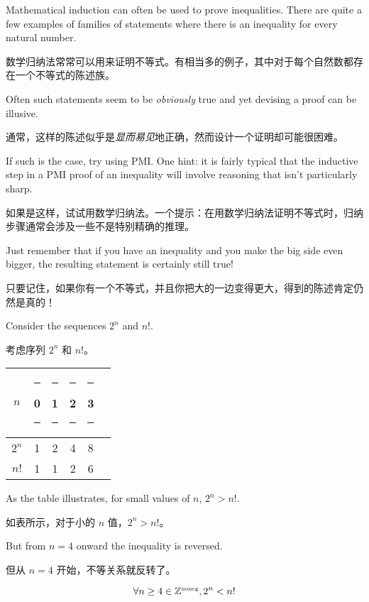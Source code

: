 Mathematical induction 
can often be used to prove inequalities.  There are quite a few examples
of families of statements where there is an inequality for every natural
number.

数学归纳法常常可以用来证明不等式。有相当多的例子，其中对于每个自然数都存在一个不等式的陈述族。

Often such statements seem to be \emph{obviously} true and yet 
devising a proof can be illusive.

通常，这样的陈述似乎是\emph{显而易见}地正确，然而设计一个证明却可能很困难。

If such is the case, try using PMI.
One hint: it is fairly typical that the inductive step in a PMI proof
of an inequality will involve reasoning that isn't particularly sharp.

如果是这样，试试用数学归纳法。一个提示：在用数学归纳法证明不等式时，归纳步骤通常会涉及一些不是特别精确的推理。

Just remember that if you have an inequality and you make the big
side even bigger, the resulting statement is certainly still true!

只要记住，如果你有一个不等式，并且你把大的一边变得更大，得到的陈述肯定仍然是真的！

Consider the sequences $2^n$ and $n!$.

考虑序列 $2^n$ 和 $n!$。

\begin{center}
\begin{tabular}{c|ccccc}
$n$   & \rule{6pt}{0pt} 0 \rule{6pt}{0pt} & \rule{6pt}{0pt} 1 \rule{6pt}{0pt} &\rule{6pt}{0pt} 2 \rule{6pt}{0pt} & \rule{6pt}{0pt} 3 \rule{6pt}{0pt} & \\ \hline
$2^n$ & 1 & 2 & 4 & 8 & \\ \hline
$n!$  & 1 & 1 & 2 & 6 & \\
\end{tabular}
\end{center}

As the table illustrates, for small values of $n$, $2^n > n!$.

如表所示，对于小的 $n$ 值，$2^n > n!$。

But from $n=4$
onward the inequality is reversed.

但从 $n=4$ 开始，不等关系就反转了。

\begin{thm} 
\[ \forall n \geq 4 \in {\mathbb Z}^{\mbox{\tiny noneg}}, 2^n < n!
\]
\end{thm}

